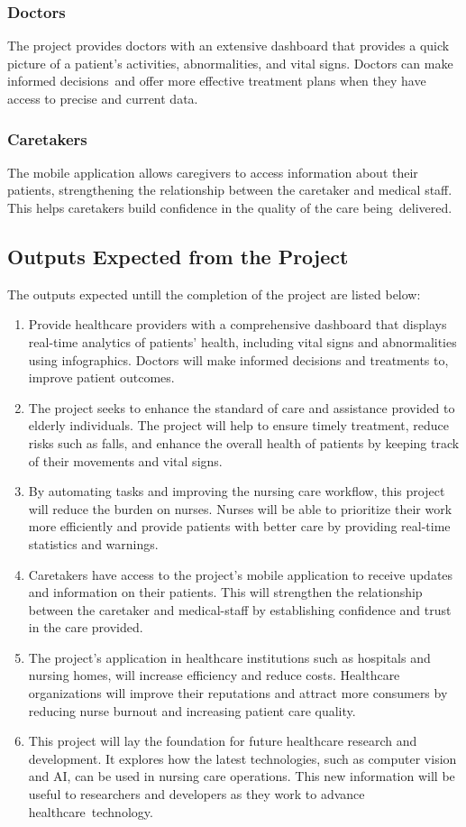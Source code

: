 \subsubsection{Doctors}
The project provides doctors with an extensive dashboard that provides a quick picture of a patient's activities, abnormalities, and vital signs. Doctors can make informed decisions and  offer more effective treatment plans when they have access to precise and current data.
\subsubsection{Caretakers}
The mobile application allows caregivers to access information about their patients, strengthening the relationship between the caretaker and  medical staff. This helps caretakers  build confidence in the quality of the care being delivered.
\subsection{Outputs Expected from the Project}
The outputs expected untill  the completion of the project are listed below:
\begin{enumerate}
    \item Provide healthcare providers with a comprehensive dashboard that displays real-time analytics of patients' health, including vital signs and abnormalities using infographics. Doctors will make informed decisions and treatments to, improve patient outcomes.
    \item The project seeks to enhance the standard of care and assistance provided to elderly individuals. The project will help to ensure timely treatment, reduce risks such as falls, and enhance the overall health of patients by keeping track of their movements and vital signs.
    \item By automating tasks and improving the nursing care workflow, this project will reduce the burden on nurses. Nurses will be able to prioritize their work more efficiently and provide patients with better care by providing real-time statistics and warnings.
    \item Caretakers  have access to the project's mobile application to receive updates and information on their patients. This will strengthen the relationship between the caretaker and medical-staff by establishing confidence and trust in the care provided.
    \item The project's application in healthcare institutions such as hospitals and nursing homes, will increase efficiency and reduce costs. Healthcare organizations will improve their reputations and attract more consumers by reducing nurse burnout and increasing patient care quality.
    \item This project will lay the foundation for future healthcare research and development. It explores how the latest technologies, such as computer vision and AI, can be used in nursing care operations. This new information will be useful to researchers and developers as they work to advance healthcare technology.
\end{enumerate}
